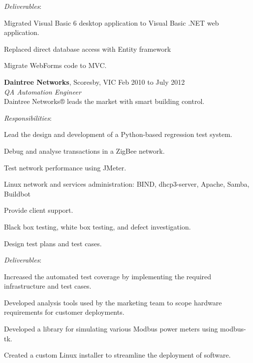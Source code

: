 \documentclass[line,margin]{res}
\begin{document}
\begin{resume}
        \textit{Deliverables}:
        \begin{list}{}{\leftmargin=1em \itemsep=-2pt}
            \item{Migrated Visual Basic 6 desktop application to Visual Basic .NET web application.}
            \item{Replaced direct database access with Entity framework}
            \item{Migrate WebForms code to MVC.}
        \end{list}

        \textbf{Daintree Networks}, Scoresby, VIC \hfill Feb 2010 to July 2012 \\
        \textit{QA Automation Engineer}\\
        Daintree Networks® leads the market with smart building control.

        \textit{Responsibilities}:
        \begin{list}{}{\leftmargin=1em \itemsep=-2pt}
            \item{Lead the design and development of a Python-based regression test system.}
            \item{Debug and analyse transactions in a ZigBee network.}
            \item{Test network performance using JMeter.}
            \item{Linux network and services administration: BIND, dhcp3-server, Apache, Samba, Buildbot}
            \item{Provide client support.}
            \item{Black box testing, white box testing, and defect investigation.}
            \item{Design test plans and test cases.}
        \end{list}
             
        \textit{Deliverables}:
        \begin{list}{}{\leftmargin=1em \itemsep=-2pt}
            \item{Increased the automated test coverage by implementing the required infrastructure and test cases.}
            \item{Developed analysis tools used by the marketing team to scope hardware requirements for customer deployments.}
            \item{Developed a library for simulating various Modbus power meters using modbus-tk.}
            \item{Created a custom Linux installer to streamline the deployment of software.}
        \end{list}


\end{resume}
\end{document}
